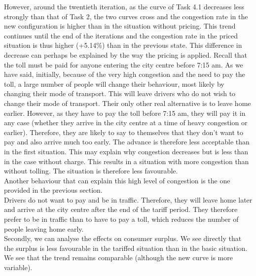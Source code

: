 \documentclass[a4paper, 12pt,oneside]{article}
\begin{document}
However, around the twentieth iteration, as the curve of Task 4.1 decreases less strongly than that of Task 2, the two curves cross and the congestion rate in the new configuration is higher than in the situation without pricing. This trend continues until the end of the iterations and the congestion rate in the priced situation is thus higher (+5.14\%) than in the previous state. This difference in decrease can perhaps be explained by the way the pricing is applied. Recall that the toll must be paid for anyone entering the city centre before 7:15 am. As we have said, initially, because of the very high congestion and the need to pay the toll, a large number of people will change their behaviour, most likely by changing their mode of transport. This will leave drivers who do not wish to change their mode of transport. Their only other real alternative is to leave home earlier. However, as they have to pay the toll before 7:15 am, they will pay it in any case (whether they arrive in the city centre at a time of heavy congestion or earlier). Therefore, they are likely to say to themselves that they don't want to pay and also arrive much too early. The advance is therefore less acceptable than in the first situation. This may explain why congestion decreases but is less than in the case without charge. This results in a situation with more congestion than without tolling. The situation is therefore less favourable.\\

Another behaviour that can explain this high level of congestion is the one provided in the previous section.\\

Drivers do not want to pay and be in traffic. Therefore, they will leave home later and arrive at the city centre after the end of the tariff period. They therefore prefer to be in traffic than to have to pay a toll, which reduces the number of people leaving home early.\\

Secondly, we can analyse the effects on consumer surplus. We see directly that the surplus is less favourable in the tariffed situation than in the basic situation. We see that the trend remains comparable (although the new curve is more variable).\\
\end{document}
